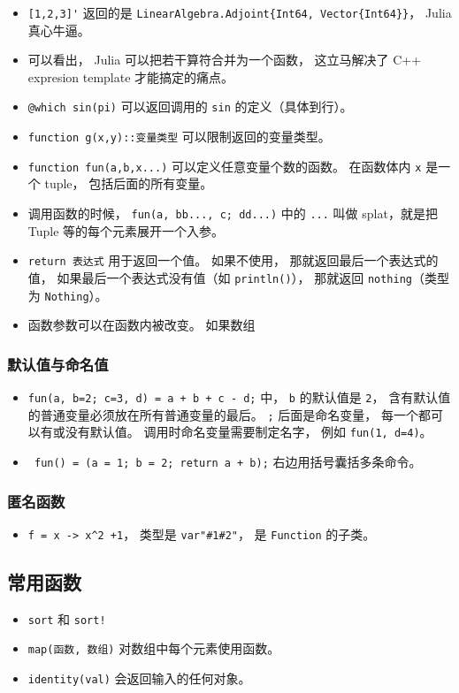 \begin{itemize}
\item \verb`[1,2,3]'` 返回的是 \verb`LinearAlgebra.Adjoint{Int64, Vector{Int64}}`， Julia 真心牛逼。
\item 可以看出， Julia 可以把若干算符合并为一个函数， 这立马解决了 C++ expresion template 才能搞定的痛点。
\item \verb`@which sin(pi)` 可以返回调用的 \verb`sin` 的定义（具体到行）。
\item \verb`function g(x,y)::变量类型` 可以限制返回的变量类型。
\item \verb`function fun(a,b,x...)` 可以定义任意变量个数的函数。 在函数体内 \verb`x` 是一个 tuple， 包括后面的所有变量。
\item 调用函数的时候， \verb`fun(a, bb..., c; dd...)` 中的 \verb`...` 叫做 splat，就是把 Tuple 等的每个元素展开一个入参。
\item \verb`return 表达式` 用于返回一个值。 如果不使用， 那就返回最后一个表达式的值， 如果最后一个表达式没有值（如 \verb`println()`）， 那就返回 \verb`nothing`（类型为 \verb`Nothing`）。
\item 函数参数可以在函数内被改变。 如果数组
\end{itemize}

\subsubsection{默认值与命名值}
\begin{itemize}
\item \verb`fun(a, b=2; c=3, d) = a + b + c - d;` 中， \verb`b` 的默认值是 \verb`2`， 含有默认值的普通变量必须放在所有普通变量的最后。 \verb`;` 后面是命名变量， 每一个都可以有或没有默认值。 调用时命名变量需要制定名字， 例如 \verb`fun(1, d=4)`。
\item \verb` fun() = (a = 1; b = 2; return a + b);` 右边用括号囊括多条命令。
\end{itemize}

\subsubsection{匿名函数}
\begin{itemize}
\item \verb`f = x -> x^2 +1`， 类型是 \verb`var"#1#2"`， 是 \verb`Function` 的子类。
\end{itemize}

\subsection{常用函数}
\begin{itemize}
\item \verb`sort` 和 \verb`sort!`
\item \verb`map(函数, 数组)` 对数组中每个元素使用函数。
\item \verb`identity(val)` 会返回输入的任何对象。
\end{itemize}

